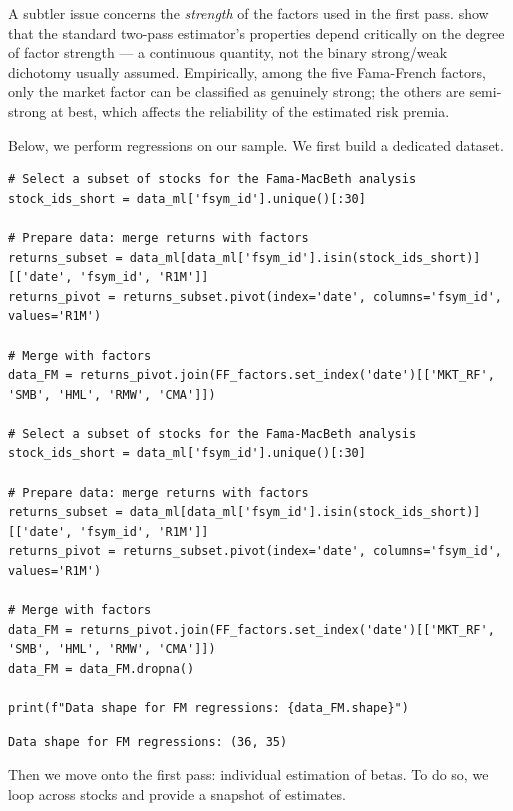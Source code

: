 A subtler issue concerns the \textit{strength} of the factors used in the first pass. \cite{pesaran2021factor} show that the standard two-pass estimator's properties depend critically on the degree of factor strength --- a continuous quantity, not the binary strong/weak dichotomy usually assumed. Empirically, among the five Fama-French factors, only the market factor can be classified as genuinely strong; the others are semi-strong at best, which affects the reliability of the estimated risk premia.

Below, we perform \cite{fama1973risk} regressions on our sample. We first build a dedicated dataset.

\begin{verbatim}
# Select a subset of stocks for the Fama-MacBeth analysis
stock_ids_short = data_ml['fsym_id'].unique()[:30]

# Prepare data: merge returns with factors
returns_subset = data_ml[data_ml['fsym_id'].isin(stock_ids_short)][['date', 'fsym_id', 'R1M']]
returns_pivot = returns_subset.pivot(index='date', columns='fsym_id', values='R1M')

# Merge with factors
data_FM = returns_pivot.join(FF_factors.set_index('date')[['MKT_RF', 'SMB', 'HML', 'RMW', 'CMA']])

# Select a subset of stocks for the Fama-MacBeth analysis
stock_ids_short = data_ml['fsym_id'].unique()[:30]

# Prepare data: merge returns with factors
returns_subset = data_ml[data_ml['fsym_id'].isin(stock_ids_short)][['date', 'fsym_id', 'R1M']]
returns_pivot = returns_subset.pivot(index='date', columns='fsym_id', values='R1M')

# Merge with factors
data_FM = returns_pivot.join(FF_factors.set_index('date')[['MKT_RF', 'SMB', 'HML', 'RMW', 'CMA']])
data_FM = data_FM.dropna()

print(f"Data shape for FM regressions: {data_FM.shape}")
\end{verbatim}

\begin{verbatim}
Data shape for FM regressions: (36, 35)
\end{verbatim}

Then we move onto the first pass: individual estimation of betas. To do so, we loop across stocks and provide a snapshot of estimates.

